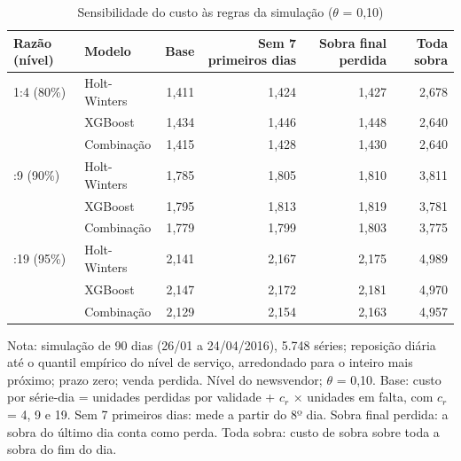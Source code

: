 \begin{table}[htbp]
\centering
\small
\caption{Sensibilidade do custo às regras da simulação ($\theta$ = 0,10)}
\label{tab:sim_sensibilidade}
\begin{tabular}{llrrrr}
\toprule
Razão (nível) & Modelo & Base & Sem 7 primeiros dias & Sobra final perdida & Toda sobra \\
\midrule
1:4 (80\%) & Holt-Winters & 1,411 & 1,424 & 1,427 & 2,678 \\
 & XGBoost & 1,434 & 1,446 & 1,448 & 2,640 \\
 & Combinação & 1,415 & 1,428 & 1,430 & 2,640 \\
\addlinespace
1:9 (90\%) & Holt-Winters & 1,785 & 1,805 & 1,810 & 3,811 \\
 & XGBoost & 1,795 & 1,813 & 1,819 & 3,781 \\
 & Combinação & 1,779 & 1,799 & 1,803 & 3,775 \\
\addlinespace
1:19 (95\%) & Holt-Winters & 2,141 & 2,167 & 2,175 & 4,989 \\
 & XGBoost & 2,147 & 2,172 & 2,181 & 4,970 \\
 & Combinação & 2,129 & 2,154 & 2,163 & 4,957 \\
\bottomrule
\end{tabular}
\par\smallskip
{\footnotesize Nota: simulação de 90 dias (26/01 a 24/04/2016), 5.748 séries; reposição diária até o quantil empírico do nível de serviço, arredondado para o inteiro mais próximo; prazo zero; venda perdida. Nível do newsvendor; $\theta$ = 0,10. Base: custo por série-dia = unidades perdidas por validade + $c_r$ × unidades em falta, com $c_r$ = 4, 9 e 19. Sem 7 primeiros dias: mede a partir do 8º dia. Sobra final perdida: a sobra do último dia conta como perda. Toda sobra: custo de sobra sobre toda a sobra do fim do dia.}
\end{table}
